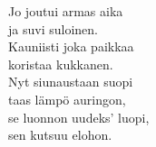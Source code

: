 
            Jo joutui armas aika \\
            ja suvi suloinen. \\
            Kauniisti joka paikkaa \\
            koristaa kukkanen. \\
            Nyt siunaustaan suopi \\
            taas lämpö auringon, \\
            se luonnon uudeks' luopi, \\
            sen kutsuu elohon. \\
